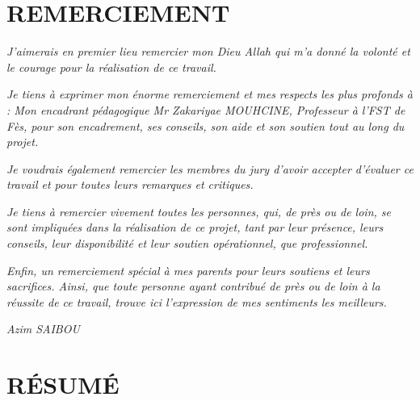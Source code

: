 \documentclass{report}
\begin{document}


\sffamily



\chapter*{REMERCIEMENT}
 
\textit{J'aimerais en premier lieu remercier mon Dieu Allah qui m'a donné la volonté et le courage pour la réalisation de ce travail.}

\vspace{0.8cm}

\textit{Je tiens à exprimer mon énorme remerciement et mes respects les plus profonds à : 
Mon encadrant pédagogique Mr Zakariyae MOUHCINE, Professeur à l'FST de Fès, pour son encadrement, ses conseils, son aide et son soutien tout au long du projet.}

\vspace{0.8cm}

\textit{Je voudrais également remercier les membres du jury d'avoir accepter d'évaluer ce travail et pour toutes leurs remarques et critiques.}

\vspace{0.8cm}


\textit{Je tiens à remercier vivement toutes les personnes, qui, de près ou de loin, se sont impliquées dans la réalisation de ce projet, tant par leur présence, leurs conseils, leur disponibilité et leur soutien opérationnel, que professionnel.
}

\vspace{0.8cm}

\textit{Enfin, un remerciement spécial à mes parents pour leurs soutiens et leurs sacrifices. Ainsi, que toute personne ayant contribué de près ou de loin à la réussite de ce travail, trouve ici l’expression de mes sentiments les meilleurs.}

\vspace{0.7cm}

\hfill\textit{Azim SAIBOU}



\chapter*{RÉSUMÉ}

\vspace{1.5cm}
\end{document}
